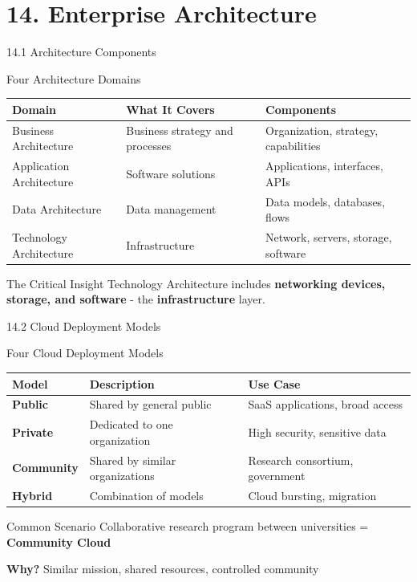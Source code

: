 \documentclass{beamer}
\begin{document}
	\section{14. Enterprise Architecture}
	
	\begin{frame}{14.1 Architecture Components}
		\begin{block}{Four Architecture Domains}
			\begin{tabular}{|p{2.5cm}|p{4cm}|p{4.5cm}|}
				\hline
				\textbf{Domain} & \textbf{What It Covers} & \textbf{Components} \\
				\hline
				Business Architecture & Business strategy and processes & Organization, strategy, capabilities \\
				\hline
				Application Architecture & Software solutions & Applications, interfaces, APIs \\
				\hline
				Data Architecture & Data management & Data models, databases, flows \\
				\hline
				Technology Architecture & Infrastructure & Network, servers, storage, software \\
				\hline
			\end{tabular}
		\end{block}
		
		\begin{alertblock}{The Critical Insight}
			Technology Architecture includes \textbf{networking devices, storage, and software} - the \textbf{infrastructure} layer.
		\end{alertblock}
	\end{frame}
	
	\begin{frame}{14.2 Cloud Deployment Models}
		\begin{block}{Four Cloud Deployment Models}
			\begin{tabular}{|p{2.5cm}|p{4cm}|p{4.5cm}|}
				\hline
				\textbf{Model} & \textbf{Description} & \textbf{Use Case} \\
				\hline
				\textbf{Public} & Shared by general public & SaaS applications, broad access \\
				\hline
				\textbf{Private} & Dedicated to one organization & High security, sensitive data \\
				\hline
				\textbf{Community} & Shared by similar organizations & Research consortium, government \\
				\hline
				\textbf{Hybrid} & Combination of models & Cloud bursting, migration \\
				\hline
			\end{tabular}
		\end{block}
		
		\begin{exampleblock}{Common Scenario}
			Collaborative research program between universities = \textbf{Community Cloud}
			
			\textbf{Why?} Similar mission, shared resources, controlled community
		\end{exampleblock}
	\end{frame}
	
\end{document}
